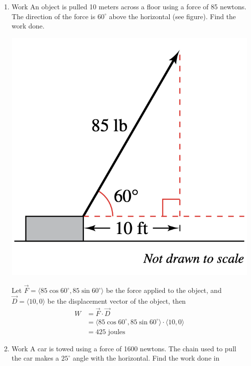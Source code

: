 \begin{enumerate}
          \newpage
    \item Work An object is pulled 10 meters across a floor using a force of 85 newtons.
          The direction of the force is $60^{\circ}$ above the horizontal (see figure).
          Find the work done.
          \begin{center}
              \includegraphics[scale=0.4,valign=t]{assets/larson11.3q59.png}
          \end{center}
          \sol{} Let $\vec{F} = \langle 85 \cos 60^{\circ}, 85 \sin 60^{\circ} \rangle$ be the force applied to the object, and $\vec{D} = \langle 10, 0 \rangle$ be the displacement vector of the object, then
          \begin{align*}
              W & = \vec{F} \cdot \vec{D}                                                              \\
                & = \langle 85 \cos 60^{\circ}, 85 \sin 60^{\circ} \rangle \cdot \langle 10, 0 \rangle \\
                & = 425 \text{ joules}
          \end{align*}
          \setcounter{enumi}{60}
    \item Work A car is towed using a force of 1600 newtons. The chain used to pull the
          car makes a $25^{\circ}$ angle with the horizontal. Find the work done in

\end{enumerate}
